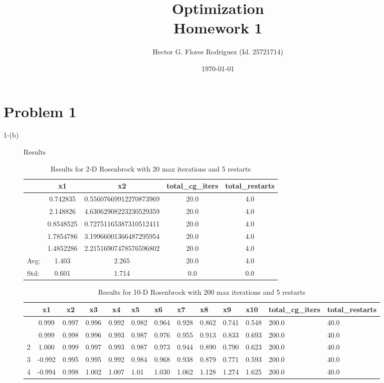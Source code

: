 \documentclass[11pt,onside]{article}
\title{\blue Optimization \\
\blueb Homework 1}
\author{Hector G. Flores Rodriguez (Id. 25721714)}
\date{\today} %
\begin{document}
\maketitle

\section{Problem 1}
\begin{description}
\item[1-(b)] Results

\begin {table}[ht]
\centering
\caption {Results for 2-D Rosenbrock with 20 max iterations and 5 restarts}
\begin{tabular}{lcccc}
\toprule
{} &                      x1 &                      x2 &  total\_cg\_iters &  total\_restarts \\
\midrule
&  0.742835 &  0.55607669912270873969 &            20.0 &             4.0 \\
&  2.148826 &  4.63062908223230529359 &            20.0 &             4.0 \\
&  0.8548525 &  0.72751165387310512411 &            20.0 &             4.0 \\
&  1.7854786 &  3.19966001366487295954 &            20.0 &             4.0 \\
&  1.4852286 &  2.21516907478576596802 &            20.0 &             4.0 \\
\bottomrule
Avg: & 1.403 & 2.265 & 20.0 & 4.0 \\
Std: & 0.601 & 1.714 & 0.0 & 0.0 \\
\bottomrule
\end{tabular}
\end{table}

\begin {table}[ht]
\centering
\caption {Results for 10-D Rosenbrock with 200 max iterations and 5 restarts}
\begin{tabular}{lcccc}
\toprule
{} &                      x1 &                      x2 &                      x3 &                      x4 &                      x5 &                      x6 &                      x7 &                      x8 &                      x9 &                     x10 &  total\_cg\_iters &  total\_restarts \\
\midrule
&  0.999 &  0.997&  0.996&  0.992 &  0.982 &  0.964 &  0.928 &  0.862 &  0.741 &  0.548 &           200.0 &            40.0 \\
&  0.999 &  0.998&  0.996 &  0.993 &  0.987 &  0.976 &  0.955 &  0.913 &  0.833 &  0.693 &           200.0 &            40.0 \\
2 &  1.000 &  0.999 &  0.997 &  0.993 &  0.987&  0.973&  0.944 &  0.890 &  0.790&  0.623 &           200.0 &            40.0 \\
3 & -0.992 &  0.995 &  0.995 &  0.992 &  0.984 &  0.968&  0.938&  0.879 &  0.771 &  0.593 &           200.0 &            40.0 \\
4 & -0.994 &  0.998 &  1.002 &  1.007 &  1.01 &  1.030 &  1.062 &  1.128 &  1.274 &  1.625 &           200.0 &            40.0 \\
\bottomrule


\end{tabular}
\end{table}
\end{description}
\end{document}
